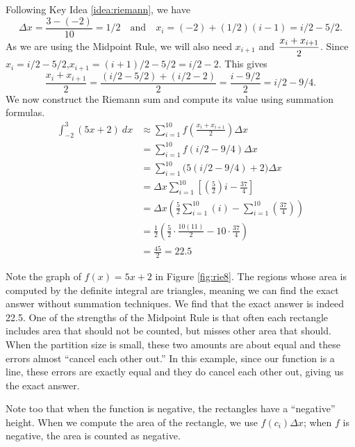 {Following Key Idea \ref{idea:riemann}, we have
	$$\Delta x = \frac{3 - (-2)}{10} = 1/2 \quad \text{and} \quad x_i = (-2) + (1/2)(i-1) = i/2-5/2.$$
	As we are using the Midpoint Rule, we will also need $x_{i+1}$ and $\displaystyle \frac{x_i+x_{i+1}}2$. Since $x_i = i/2-5/2$,\quad $x_{i+1} = (i+1)/2 - 5/2 = i/2 -2$.
	This gives 
	$$\frac{x_i+x_{i+1}}2 = \frac{(i/2-5/2) + (i/2-2)}{2} = \frac{i-9/2}{2} = i/2 - 9/4.$$
	We now construct the Riemann sum and compute its value using summation formulas.
\begin{align*}
\int_{-2}^3 (5x+2)\ dx 	&\approx \sum_{i=1}^{10} f\left(\frac{x_i+x_{i+1}}{2}\right)\Delta x \\
												&=	\sum_{i=1}^{10} f(i/2 - 9/4)\Delta x \\
												&=	\sum_{i=1}^{10} \big(5(i/2-9/4) + 2\big)\Delta x\\
												&=	\Delta x\sum_{i=1}^{10}\left[\left(\frac{5}{2}\right)i - \frac{37}{4}\right]\\
												&=	\Delta x\left(\frac{5}2\sum_{i=1}^{10} (i) - \sum_{i=1}^{10}\left(\frac{37}{4}\right)\right) \\
												&= \frac12\left(\frac52\cdot\frac{10(11)}{2} - 10\cdot\frac{37}4\right)  \\
												&= \frac{45}2 = 22.5
\end{align*}

Note the graph of $f(x) = 5x+2$ in Figure \ref{fig:rie8}. The regions whose area is computed by the definite integral are triangles, meaning we can find the exact answer without summation techniques. We find that the exact answer is indeed 22.5. One of the strengths of the Midpoint Rule is that often each rectangle includes area that should not be counted, but misses other area that should. When the partition size is small, these two amounts are about equal and these errors almost ``cancel each other out.'' In this example, since our function is a line, these errors are exactly equal and they do cancel each other out, giving us the exact answer.

Note too that when the function is negative, the rectangles have a ``negative'' height. When we compute the area of the rectangle, we use $f(c_i)\Delta x$; when $f$ is negative, the area is counted as negative.
}\\

